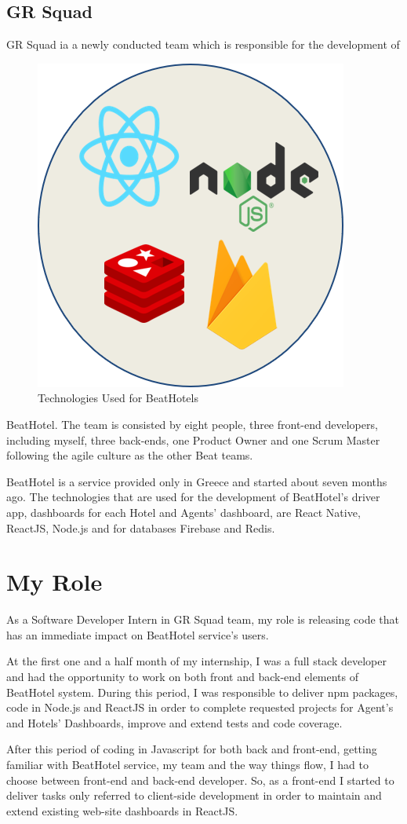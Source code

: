 \subsection{ GR Squad }
GR Squad ia a newly conducted team which is responsible for the development of 
\begin{figure}
	\begin{center}
		\includegraphics[scale=0.25]{images/technologies_used.png}
	\end{center}
	\caption{Technologies Used for BeatHotels}
\end{figure}
BeatHotel. The team is consisted by eight people, three front-end developers, including myself, three back-ends, one Product Owner and one Scrum Master following the agile culture as the other Beat teams.\par 
BeatHotel is a service provided only in Greece and started about seven months ago. The technologies that are used for the development of BeatHotel's driver app, dashboards for each Hotel and Agents' dashboard, are React Native, ReactJS, Node.js and for databases Firebase and Redis.

\section{ My Role }
As a Software Developer Intern in GR Squad team, my role is releasing code that has an immediate impact on BeatHotel service's users. \par
At the first one and a half month of my internship, I was a full stack developer and had the opportunity to work on both front and back-end elements of BeatHotel system. During this period, I was responsible to deliver npm packages, code in Node.js and ReactJS in order to complete requested projects for Agent's and Hotels' Dashboards, improve and extend tests and code coverage.\par 
After this period of coding in Javascript for both back and front-end, getting familiar with BeatHotel service, my team and the way things flow, I had to choose between front-end and back-end developer. So, as a front-end I started to deliver tasks only referred to client-side development in order to maintain and extend existing web-site dashboards in ReactJS.
\newpage
